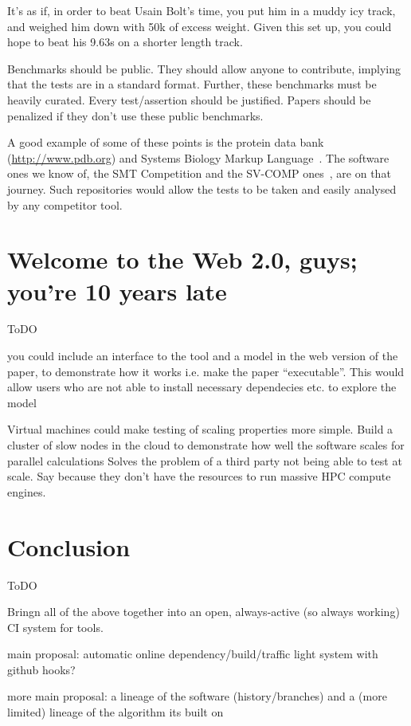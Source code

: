\documentclass[conference]{IEEEtran}
\begin{document}
It's as if, in order to beat Usain Bolt's time, you put him in a muddy
icy track, and weighed him down with 50k of excess weight. Given this
set up, you could hope to beat his 9.63s on a shorter length track.

Benchmarks should be public. They should allow anyone to contribute,
implying that the tests are in a standard format. Further, these
benchmarks must be heavily curated. Every test/assertion should be
justified. Papers should be penalized if they don't use these public
benchmarks.

A good example of some of these points is the protein data bank
(\url{http://www.pdb.org}) and Systems Biology Markup
Language~\cite{Hucka2003,Chaouiya2013}. The software ones we know of,
the SMT Competition and the SV-COMP ones~\cite{SMTComp2014,
  SVCOMP2015}, are on that journey. Such repositories would
allow the tests to be taken and easily analysed by any competitor
tool.

\section{Welcome to the Web 2.0, guys; you're 10 years late} 

ToDO 

you could include an interface to the tool and a model in the web
version of the paper, to demonstrate how it works i.e. make the paper
``executable''. This would allow users who are not able to install
necessary dependecies etc. to explore the model \cite{Hall2014}

Virtual machines could make testing of scaling properties more simple. 
Build a cluster of slow nodes in the cloud to demonstrate how well the
software scales for parallel calculations
%
Solves the problem of a third party not being able to test at
scale. Say because they don't have the resources to run massive HPC
compute engines.


\section{Conclusion}
\label{sec:Conclusion} 

ToDO 

Bringn all of the above together into an open, always-active (so always working) CI
system for tools. 

main proposal: automatic online dependency/build/traffic light system
with github hooks?

more main proposal: a lineage of the software (history/branches) and a
(more limited) lineage of the algorithm its built on





\end{document}
